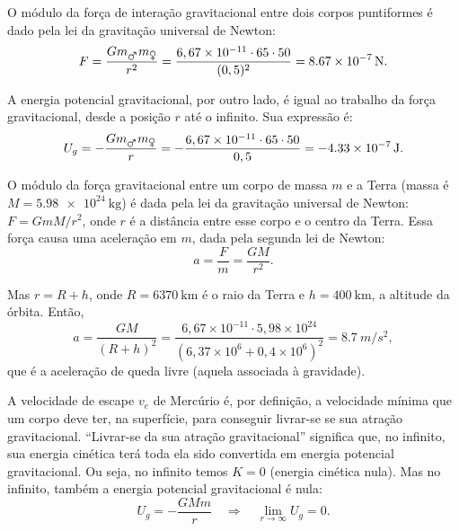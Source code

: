 \documentclass[a4paper]{article}
\newcommand\myrightarrow{\quad\Rightarrow\quad}
\begin{document}
\begin{resolucoes}

  \begin{exercicio}

  \begin{compactenum}[(a)]
  
  \item O módulo da força de interação gravitacional entre dois corpos puntiformes é dado pela lei da gravitação universal de Newton:
  \begin{equation*}
  F = \frac{Gm_{\mars}m_{\venus}}{r^2} = \frac{6,67\times10^{-11}\cdot65\cdot50}{(0,5)^2} = \SI{8.67e-7}{\newton}.
  \end{equation*}
  
  \item A energia potencial gravitacional, por outro lado, é igual ao trabalho da força gravitacional, desde a posição $r$ até o infinito.
  Sua expressão é:
  \begin{equation*}
  U_g = -\frac{Gm_{\mars}m_{\venus}}{r} = -\frac{6,67\times10^{-11}\cdot65\cdot50}{0,5} = \SI{-4.33e-7}{\joule}.
  \end{equation*}
  \end{compactenum}
  \end{exercicio}
  
  \begin{exercicio*}
   O módulo da força gravitacional entre um corpo de massa $m$ e a Terra (massa é $M = \SI{5.98e24}{\kilo\gram}$) é dada pela lei da gravitação universal de Newton:
  $F = GmM/r^2$, onde $r$ é a distância entre esse corpo e o centro da Terra.
  Essa força causa uma aceleração em $m$, dada pela segunda lei de Newton: 
  \begin{equation*}
  a = \frac{F}{m} = \frac{GM}{r^2}.
  \end{equation*}
  
  Mas $r = R + h$, onde $R = \SI{6370}{\kilo\metre}$ é o raio da Terra e $h = \SI{400}{\kilo\metre}$, a altitude da órbita.
  Então,
  \begin{equation*}
  a = \frac{GM}{(R + h)^2} = \frac{6,67\times10^{-11}\cdot 5,98\times10^{24}}{\left(6,37\times10^{6}+0,4\times10^{6}\right)^2} = \SI{8.7}{m/s^2},
  \end{equation*}
  que é a aceleração de queda livre (aquela associada à gravidade).
  \end{exercicio*}
  
  \begin{exercicio}
   A velocidade de escape $v_e$ de Mercúrio é, por definição, a velocidade mínima que um corpo deve ter, na superfície, para conseguir livrar-se se sua atração gravitacional.
  ``Livrar-se da sua atração gravitacional'' significa que, no infinito, sua energia cinética terá toda ela sido convertida em energia potencial gravitacional. Ou seja, no infinito temos $K = 0$ (energia cinética nula). Mas no infinito, também a energia potencial gravitacional é nula: 
  \begin{equation*}
  U_g = -\frac{GMm}{r} \myrightarrow \lim_{r \to \infty} U_g = 0.
  \end{equation*}


\end{exercicio}
\end{resolucoes}
\end{document}
